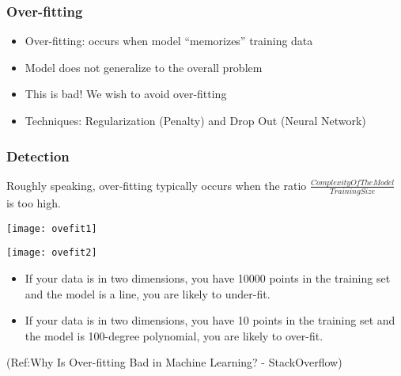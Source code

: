 \begin{frame}[fragile]\frametitle{Over-fitting}
\begin{itemize}
\item Over-fitting: occurs when model ``memorizes'' training data
\item Model does not generalize to the overall problem
\item This is bad! We wish to avoid over-fitting
\item Techniques: Regularization (Penalty) and Drop Out (Neural Network)
\end{itemize}
\end{frame}


\begin{frame}[fragile]\frametitle{Detection}
Roughly speaking, over-fitting typically occurs when the ratio $\frac{ComplexityOfTheModel}{TrainingSize}$ is too high.

\begin{center}
\texttt{[image: ovefit1]}

\texttt{[image: ovefit2]}

\end{center}
	\begin{itemize}
	\item If your data is in two dimensions, you have 10000 points in the training set and the model is a line, you are likely to under-fit.
	\item If your data is in two dimensions, you have 10 points in the training set and the model is 100-degree polynomial, you are likely to over-fit. 
	\end{itemize}
	
(Ref:Why Is Over-fitting Bad in Machine Learning? - StackOverflow)
\end{frame}

